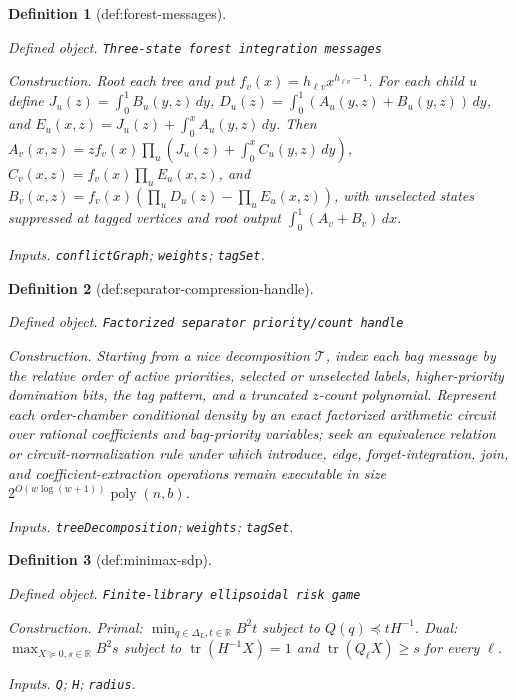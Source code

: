 \documentclass{article}
\newtheorem{definition}{Definition}
\begin{document}
\begin{definition}[def:forest-messages]\label{def:forest-messages}
\par\smallskip\noindent\emph{Defined object.} \texttt{Three-\allowbreak{}state forest integration messages}
\par\smallskip\noindent\emph{Construction.} Root each tree and put \(f_v(x)=h_{\ell v}x^{h_{\ell v}-1}\). For each child \(u\) define \(J_u(z)=\int_0^1B_u(y,z)\,dy\), \(D_u(z)=\int_0^1(A_u(y,z)+B_u(y,z))\,dy\), and \(E_u(x,z)=J_u(z)+\int_0^xA_u(y,z)\,dy\). Then \(A_v(x,z)=zf_v(x)\prod_u(J_u(z)+\int_0^xC_u(y,z)\,dy)\), \(C_v(x,z)=f_v(x)\prod_uE_u(x,z)\), and \(B_v(x,z)=f_v(x)(\prod_uD_u(z)-\prod_uE_u(x,z))\), with unselected states suppressed at tagged vertices and root output \(\int_0^1(A_v+B_v)\,dx\).
\par\smallskip\noindent\emph{Inputs.} \texttt{conflictGraph}; \texttt{weights}; \texttt{tagSet}.
\end{definition}

\begin{definition}[def:separator-compression-handle]\label{def:separator-compression-handle}
\par\smallskip\noindent\emph{Defined object.} \texttt{Factorized separator priority/\allowbreak{}count handle}
\par\smallskip\noindent\emph{Construction.} Starting from a nice decomposition \(\mathcal T\), index each bag message by the relative order of active priorities, selected or unselected labels, higher-priority domination bits, the tag pattern, and a truncated \(z\)-count polynomial. Represent each order-chamber conditional density by an exact factorized arithmetic circuit over rational coefficients and bag-priority variables; seek an equivalence relation or circuit-normalization rule under which introduce, edge, forget-integration, join, and coefficient-extraction operations remain executable in size \(2^{O(w\log(w+1))}\operatorname{poly}(n,b)\).
\par\smallskip\noindent\emph{Inputs.} \texttt{treeDecomposition}; \texttt{weights}; \texttt{tagSet}.
\end{definition}

\begin{definition}[def:minimax-sdp]\label{def:minimax-sdp}
\par\smallskip\noindent\emph{Defined object.} \texttt{Finite-\allowbreak{}library ellipsoidal risk game}
\par\smallskip\noindent\emph{Construction.} Primal: \(\min_{q\in\Delta_L,t\in\mathbb R}B^{2}t\) subject to \(Q(q)\preceq tH^{-1}\). Dual: \(\max_{X\succeq0,s\in\mathbb R}B^{2}s\) subject to \(\operatorname{tr}(H^{-1}X)=1\) and \(\operatorname{tr}(Q_{\ell}X)\ge s\) for every \(\ell\).
\par\smallskip\noindent\emph{Inputs.} \texttt{Q}; \texttt{H}; \texttt{radius}.
\end{definition}
\end{document}
